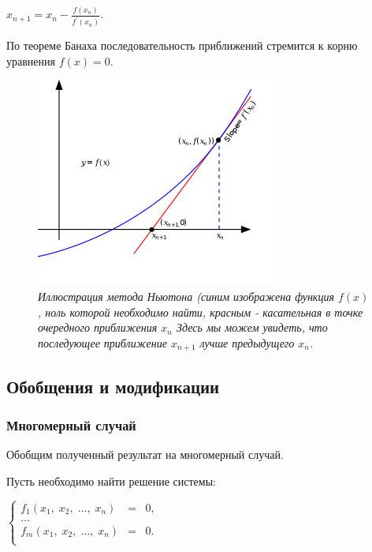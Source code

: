 \documentclass[a4paper]{article}
\begin{document}
{{{{{{{{\begin{center}
 {\(x_{n + 1} = x_{n} - \frac{f(x_{n})}{f^{\prime}(x_{n})}.\)}
\end{center}

По теореме Банаха последовательность приближений стремится к корню уравнения {\(f(x) = 0\)}.

\begin{figure}[h]
 \begin{center}
  \includegraphics[width=3.125in,height=2.70833in]{images/Newton_iteration.png}
 \end{center}
  \caption{\textit{Иллюстрация метода Ньютона (синим изображена функция {\(f(x)\)},
    ноль которой необходимо найти, красным - касательная в точке
    очередного приближения {\(x_{n}\)}
    Здесь мы можем увидеть, что последующее приближение {\(x_{n + 1}\)}
    лучше предыдущего {\(x_{n}\)}.}}
\end{figure}

\subsection{Обобщения и модификации}
\subsubsection{Многомерный случай}
Обобщим полученный результат на многомерный случай.

Пусть необходимо найти решение системы:

\begin{center}
    {\(\left\{ \begin{matrix}
    {f_{1}(x_{1},\; x_{2},\;\ldots,\; x_{n})} & = & {0,} \\
    \ldots & & \\
    {f_{m}(x_{1},\; x_{2},\;\ldots,\; x_{n})} & = & 0. \\
    \end{matrix} \right.\)}
\end{center}

}}}}}}}}
\end{document}
